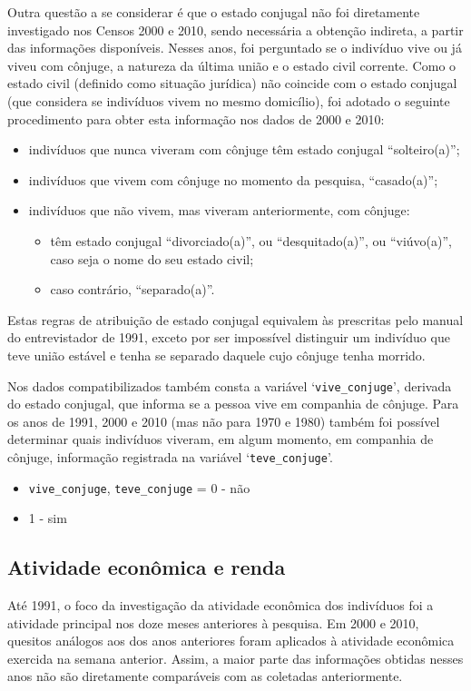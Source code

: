 \documentclass[12pt,a4paper]{article}
\newcommand{\vr}[1]{\texttt{#1}}
\begin{document}
Outra questão a se considerar é que o estado conjugal não foi diretamente investigado nos Censos 2000 e 2010, sendo necessária a obtenção indireta, a partir das informações disponíveis. Nesses anos, foi perguntado se o indivíduo vive ou já viveu com cônjuge, a natureza da última união e o estado civil corrente. Como o estado civil (definido como situação jurídica) não coincide com o estado conjugal (que considera se indivíduos vivem no mesmo domicílio), foi adotado o seguinte procedimento para obter esta informação nos dados de 2000 e 2010:
\begin{itemize}
  \item indivíduos que nunca viveram com cônjuge têm estado conjugal “solteiro(a)”;
  \item indivíduos que vivem com cônjuge no momento da pesquisa, “casado(a)”;
  \item indivíduos que não vivem, mas viveram anteriormente, com cônjuge:
  \begin{itemize}
    \item têm estado conjugal “divorciado(a)”, ou “desquitado(a)”, ou “viúvo(a)”, caso seja o nome do seu estado civil;
    \item caso contrário, “separado(a)”.
  \end{itemize}
\end{itemize}

Estas regras de atribuição de estado conjugal equivalem às prescritas pelo manual do entrevistador de 1991, exceto por ser impossível distinguir um indivíduo que teve união estável e tenha se separado daquele cujo cônjuge tenha morrido.

Nos dados compatibilizados também consta a variável ‘\vr{vive\_conjuge}’, derivada do estado conjugal, que informa se a pessoa vive em companhia de cônjuge. Para os anos de 1991, 2000 e 2010 (mas não para 1970 e 1980) também foi possível determinar quais indivíduos viveram, em algum momento, em companhia de cônjuge, informação registrada na variável ‘\vr{teve\_conjuge}’.
\begin{itemize}
  \item \vr{vive\_conjuge}, \vr{teve\_conjuge} = 0 - não
  \item 1 - sim
\end{itemize}

\subsection{Atividade econômica e renda}\label{sec:d10}
Até 1991, o foco da investigação da atividade econômica dos indivíduos foi a atividade principal nos doze meses anteriores à pesquisa. Em 2000 e 2010, quesitos análogos aos dos anos anteriores foram aplicados à atividade econômica exercida na semana anterior. Assim, a maior parte das informações obtidas nesses anos não são diretamente comparáveis com as coletadas anteriormente.
\end{document}

